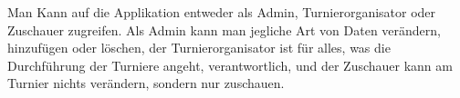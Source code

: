 Man Kann auf die Applikation entweder als Admin, Turnierorganisator oder Zuschauer zugreifen.
Als Admin kann man jegliche Art von Daten verändern, hinzufügen oder löschen, der Turnierorganisator ist 
für alles, was die Durchführung der Turniere angeht, verantwortlich, und der Zuschauer 
kann am Turnier nichts verändern, sondern nur zuschauen.
\lipsum[0]
